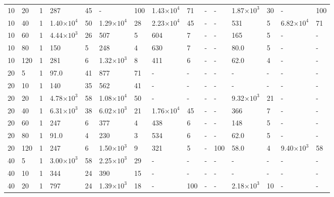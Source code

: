 \begin{table}[!ht]
\begin{center}
{\begin{tabular}{|l|l|l||l|l|l|l|l|l||l|l|l|l|l|l|}
10	&	20	&	1	&	287	&	45	&	-	&	100	&	1.43$\times10^4$	&	71	&	-	&	-	&	1.87$\times10^3$	&	30	&	-	&	100	\\



10	&	40	&	1	&	1.40$\times10^4$	&	50	&	1.29$\times10^4$	&	28	&	2.23$\times10^4$	&	45	&	-	&	-	&	531	&	5	&	6.82$\times10^4$	&	71	\\



10	&	60	&	1	&	4.44$\times10^3$	&	26	&	507	&	5	&	604	&	7	&	-	&	-	&	165	&	5	&	-	&	-	\\



10	&	80	&	1	&	150	&	5	&	248	&	4	&	630	&	7	&	-	&	-	&	80.0	&	5	&	-	&	-	\\

10	&	120	&	1	&	281	&	6	&	1.32$\times10^3$	&	8	&	411	&	6	&	-	&	-	&	62.0	&	4	&	-	&	-	\\

20	&	5	&	1	&	97.0	&	41	&	877	&	71	&	-	&	-	&	-	&	-	&	-	&	-	&	-	&	-	\\
20	&	10	&	1	&	140	&	35	&	562	&	41	&	-	&	-	&	-	&	-	&	-	&	-	&	-	&	-	\\

20	&	20	&	1	&	4.78$\times10^3$	&	58	&	1.08$\times10^4$	&	50	&	-	&	-	&	-	&	-	&	9.32$\times10^3$	&	21	&	-	&	-	\\



20	&	40	&	1	&	6.31$\times10^3$	&	38	&	6.02$\times10^3$	&	21	&	1.76$\times10^4$	&	45	&	-	&	-	&	366	&	7	&	-	&	-	\\



20	&	60	&	1	&	247	&	6	&	377	&	4	&	438	&	6	&	-	&	-	&	148	&	5	&	-	&	-	\\



20	&	80	&	1	&	91.0	&	4	&	230	&	3	&	534	&	6	&	-	&	-	&	62.0	&	5	&	-	&	-	\\


20	&	120	&	1	&	247	&	6	&	1.50$\times10^3$	&	9	&	321	&	5	&	-	&	100	&	58.0	&	4	&	9.40$\times10^3$	&	58	\\


40	&	5	&	1	&	3.00$\times10^3$	&	58	&	2.25$\times10^3$	&	29	&	-	&	-	&	-	&	-	&	-	&	-	&	-	&	-	\\
40	&	10	&	1	&	344	&	24	&	390	&	15	&	-	&	-	&	-	&	-	&	-	&	-	&	-	&	-	\\

40	&	20	&	1	&	797	&	24	&	1.39$\times10^3$	&	18	&	-	&	100	&	-	&	-	&	2.18$\times10^3$	&	10	&	-	&	-	\\




\end{tabular}}
\end{center}
\end{table}
